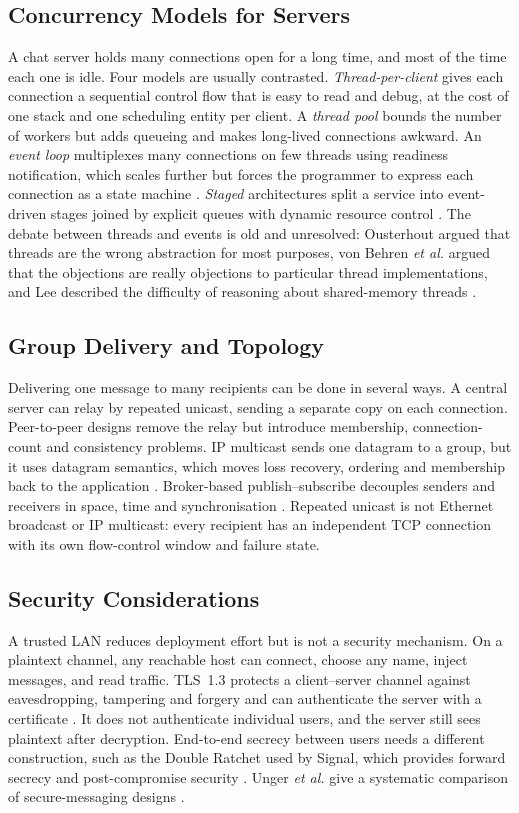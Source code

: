 \documentclass[conference]{IEEEtran}
\begin{document}
\subsection{Concurrency Models for Servers}
A chat server holds many connections open for a long time, and most of the time each one is idle. Four models are usually contrasted. \emph{Thread-per-client} gives each connection a sequential control flow that is easy to read and debug, at the cost of one stack and one scheduling entity per client. A \emph{thread pool} bounds the number of workers but adds queueing and makes long-lived connections awkward. An \emph{event loop} multiplexes many connections on few threads using readiness notification, which scales further but forces the programmer to express each connection as a state machine \cite{kegel,krohn}. \emph{Staged} architectures split a service into event-driven stages joined by explicit queues with dynamic resource control \cite{seda}. The debate between threads and events is old and unresolved: Ousterhout argued that threads are the wrong abstraction for most purposes, von Behren \emph{et al.} argued that the objections are really objections to particular thread implementations, and Lee described the difficulty of reasoning about shared-memory threads \cite{ousterhout,vonbehren,lee}.

\subsection{Group Delivery and Topology}
Delivering one message to many recipients can be done in several ways. A central server can relay by repeated unicast, sending a separate copy on each connection. Peer-to-peer designs remove the relay but introduce membership, connection-count and consistency problems. IP multicast sends one datagram to a group, but it uses datagram semantics, which moves loss recovery, ordering and membership back to the application \cite{rfc1112}. Broker-based publish--subscribe decouples senders and receivers in space, time and synchronisation \cite{eugster}. Repeated unicast is not Ethernet broadcast or IP multicast: every recipient has an independent TCP connection with its own flow-control window and failure state.

\subsection{Security Considerations}
A trusted LAN reduces deployment effort but is not a security mechanism. On a plaintext channel, any reachable host can connect, choose any name, inject messages, and read traffic. TLS~1.3 protects a client--server channel against eavesdropping, tampering and forgery and can authenticate the server with a certificate \cite{rfc8446}. It does not authenticate individual users, and the server still sees plaintext after decryption. End-to-end secrecy between users needs a different construction, such as the Double Ratchet used by Signal, which provides forward secrecy and post-compromise security \cite{signal,cohngordon}. Unger \emph{et al.} give a systematic comparison of secure-messaging designs \cite{unger}.
\end{document}
